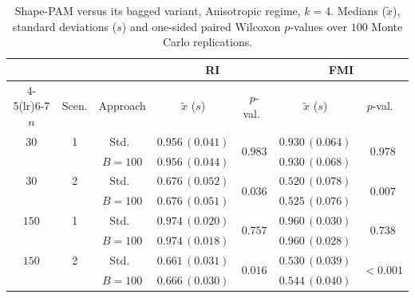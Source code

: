 \documentclass[11pt,a4paper]{article}
\begin{document}
\begin{table}[h]
\centering
\caption{Shape-PAM versus its bagged variant, Anisotropic regime, $k=4$. Medians ($\tilde x$), standard deviations ($s$) and one-sided paired Wilcoxon $p$-values over $100$ Monte Carlo replications.}
\label{tab:pam-aniso-k4}
\footnotesize
\begin{tabular}{cc c cc cc}
\toprule
& & & \multicolumn{2}{c}{\textbf{RI}} & \multicolumn{2}{c}{\textbf{FMI}} \\
\cmidrule(lr){4-5}\cmidrule(lr){6-7}
$n$ & Scen. & Approach & $\tilde x$ ($s$) & $p$-val.\ & $\tilde x$ ($s$) & $p$-val.\ \\
\midrule
$30$ & 1 & Std.\ & $0.956\,(0.041)$ & \multirow{2}{*}{$0.983$} & $0.930\,(0.064)$ & \multirow{2}{*}{$0.978$} \\
     &   & $B{=}100$ & $0.956\,(0.044)$ & & $0.930\,(0.068)$ & \\
$30$ & 2 & Std.\ & $0.676\,(0.052)$ & \multirow{2}{*}{$\mathbf{0.036}$} & $0.520\,(0.078)$ & \multirow{2}{*}{$\mathbf{0.007}$} \\
     &   & $B{=}100$ & $0.676\,(0.051)$ & & $0.525\,(0.076)$ & \\
$150$ & 1 & Std.\ & $0.974\,(0.020)$ & \multirow{2}{*}{$0.757$} & $0.960\,(0.030)$ & \multirow{2}{*}{$0.738$} \\
     &   & $B{=}100$ & $0.974\,(0.018)$ & & $0.960\,(0.028)$ & \\
$150$ & 2 & Std.\ & $0.661\,(0.031)$ & \multirow{2}{*}{$\mathbf{0.016}$} & $0.530\,(0.039)$ & \multirow{2}{*}{$\mathbf{<\!0.001}$} \\
     &   & $B{=}100$ & $0.666\,(0.030)$ & & $0.544\,(0.040)$ & \\
\bottomrule
\end{tabular}
\end{table}
\end{document}
